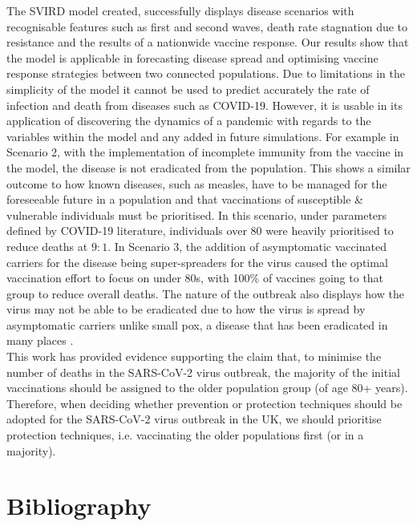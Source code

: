 \documentclass{article}
\begin{document}
\noindent
The SVIRD model created, successfully displays disease scenarios with recognisable features such as first and second waves, death rate stagnation due to resistance and the results of a nationwide vaccine response. Our results show that the model is applicable in forecasting disease spread and optimising vaccine response strategies between two connected populations. Due to limitations in the simplicity of the model it cannot be used to predict accurately the rate of infection and death from diseases such as COVID-19. However, it is usable in its application of discovering the dynamics of a pandemic with regards to the variables within the model and any added in future simulations. 
For example in Scenario 2, with the implementation of incomplete immunity from the vaccine in the model, the disease is not eradicated from the population. This shows a similar outcome to how known diseases, such as measles, have to be managed for the foreseeable future in a population and that vaccinations of susceptible \& vulnerable individuals must be prioritised. In this scenario, under parameters defined by COVID-19 literature, individuals over 80 were heavily prioritised to reduce deaths at $9:1$. In Scenario 3, the addition of asymptomatic vaccinated carriers for the disease being super-spreaders for the virus caused the optimal vaccination effort to focus on under 80s, with 100\% of vaccines going to that group to reduce overall deaths. The nature of the outbreak also displays how the virus may not be able to be eradicated due to how the virus is spread by asymptomatic carriers unlike small pox, a disease that has been eradicated in many places \cite{smallpx}. \\

\noindent
This work has provided evidence supporting the claim that, to minimise the number of deaths in the SARS-CoV-2 virus outbreak, the majority of the initial vaccinations should be assigned to the older population group (of age 80+ years). Therefore, when deciding whether prevention or protection techniques should be adopted for the SARS-CoV-2 virus outbreak in the UK, we should prioritise protection techniques, i.e. vaccinating the older populations first (or in a majority).



\newpage
\section{Bibliography}
\printbibliography
\end{document}
